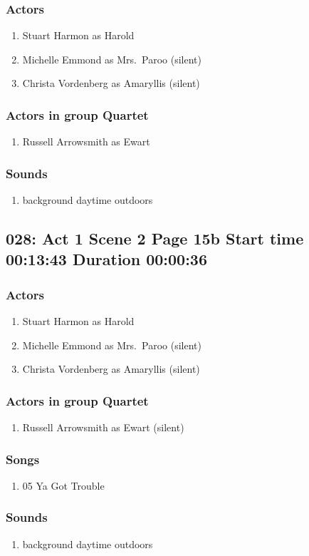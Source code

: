 \subsubsection{Actors}
\begin{enumerate}
\item Stuart Harmon as Harold
\item Michelle Emmond as Mrs.~Paroo (silent)
\item Christa Vordenberg as Amaryllis (silent)
\end{enumerate}
\subsubsection{Actors in group Quartet}
\begin{enumerate}
\item Russell Arrowsmith as Ewart
\end{enumerate}

\subsubsection{Sounds}
\begin{enumerate}
\item background daytime outdoors
\end{enumerate}
\subsection{028: Act 1 Scene 2 Page 15b Start time 00:13:43 Duration 00:00:36}

\subsubsection{Actors}
\begin{enumerate}
\item Stuart Harmon as Harold
\item Michelle Emmond as Mrs.~Paroo (silent)
\item Christa Vordenberg as Amaryllis (silent)
\end{enumerate}
\subsubsection{Actors in group Quartet}
\begin{enumerate}
\item Russell Arrowsmith as Ewart (silent)
\end{enumerate}

\subsubsection{Songs}
\begin{enumerate}
\item 05 Ya Got Trouble
\end{enumerate}\subsubsection{Sounds}
\begin{enumerate}
\item background daytime outdoors
\end{enumerate}
